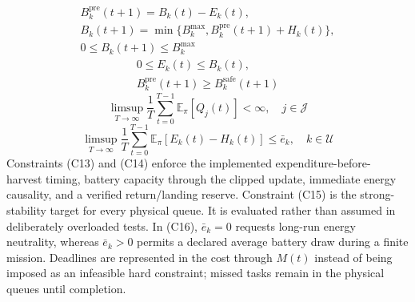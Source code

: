 \begin{equation}
\begin{gathered}
B_k^{\mathrm{pre}}(t+1)=B_k(t)-E_k(t),\\
B_k(t+1)=\min\{B_k^{\max},B_k^{\mathrm{pre}}(t+1)+H_k(t)\},\\
0\le B_k(t+1)\le B_k^{\max}
\end{gathered}
\tag{C13}\label{con:battery-dynamics}
\end{equation}
\begin{equation}
\begin{gathered}
0\le E_k(t)\le B_k(t),\\
B_k^{\mathrm{pre}}(t+1)\ge B_k^{\mathrm{safe}}(t+1)
\end{gathered}
\tag{C14}\label{con:energy-reserve}
\end{equation}
\begin{equation}
\limsup_{T\to\infty}\frac1T\sum_{t=0}^{T-1}
\mathbb E_{\pi}[Q_j(t)]<\infty,\quad j\in\mathcal J
\tag{C15}\label{con:queue-stability}
\end{equation}
\begin{equation}
\limsup_{T\to\infty}\frac1T\sum_{t=0}^{T-1}
\mathbb E_{\pi}[E_k(t)-H_k(t)]\le\bar e_k,\quad k\in\mathcal U
\tag{C16}\label{con:average-energy}
\end{equation}
Constraints (C13) and (C14) enforce the implemented expenditure-before-
harvest timing, battery capacity through the clipped update, immediate energy
causality, and a verified return/landing reserve. Constraint (C15) is the
strong-stability target for every physical queue. It is evaluated rather than
assumed in deliberately overloaded tests. In (C16), $\bar e_k=0$ requests
long-run energy neutrality, whereas $\bar e_k>0$ permits a declared average
battery draw during a finite mission. Deadlines are represented in the cost
through $M(t)$ instead of being imposed as an infeasible hard constraint;
missed tasks remain in the physical queues until completion.
